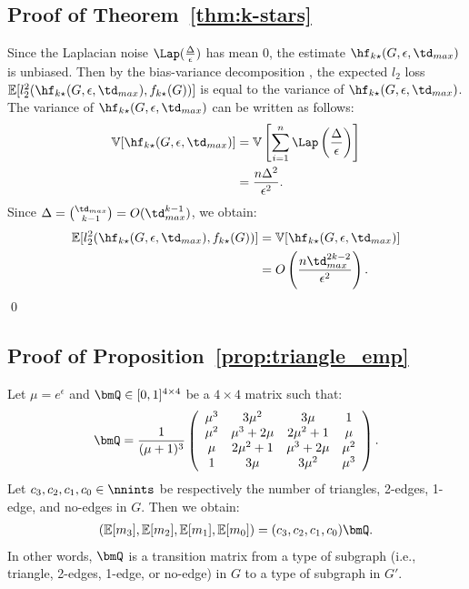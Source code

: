 \subsection{Proof of Theorem~\ref{thm:k-stars}}
Since the Laplacian noise $\Lap(\frac{\Delta}{\epsilon})$ has mean $0$, the estimate $\hf_{k\star}(G, \epsilon, \td_{max})$ is unbiased. 
Then by the bias-variance decomposition \cite{mlpp}, 
the expected $l_2$ loss 
$\mathbb{E}[l_2^2(\hf_{k\star}(G, \epsilon, \td_{max}),\allowbreak f_{k\star}(G))]$ is equal to the variance of $\hf_{k\star}(G, \epsilon, \td_{max})$. 
The variance of $\hf_{k\star}(G, \epsilon, \td_{max})$ can be written as follows:
\begin{align*}
    \mathbb{V}[\hf_{k\star}(G, \epsilon, \td_{max})] 
    &= \mathbb{V}\left[ \sum_{i=1}^n \Lap\left( \frac{\Delta}{\epsilon} \right) \right] \\
    &= \frac{n \Delta^2}{\epsilon^2}.
\end{align*}
Since $\Delta = \binom{\td_{max}}{k-1} = O(\td_{max}^{k-1})$, we obtain:
\begin{align*}
    \mathbb{E}[l_2^2(\hf_{k\star}(G, \epsilon, \td_{max}), f_{k\star}(G))] 
    &= \mathbb{V}[\hf_{k\star}(G, \epsilon, \td_{max})] \\
    &= O\left(\frac{n \td_{max}^{2k-2}}{\epsilon^2}\right).
\end{align*}
\qed

\subsection{Proof of Proposition~\ref{prop:triangle_emp}}
Let $\mu = e^\epsilon$ and $\bmQ \in [0,1]^{4 \times 4}$ be a $4 \times 4$ matrix such that:
\begin{align}
  \bmQ = \frac{1}{(\mu+1)^3} \left(
    \begin{array}{cccc}
      \mu^3 & 3\mu^2 & 3\mu & 1 \\
      \mu^2 & \mu^3+2\mu & 2\mu^2+1 & \mu \\
      \mu & 2\mu^2+1 & \mu^3+2\mu & \mu^2 \\
      1 & 3\mu & 3\mu^2 & \mu^3
    \end{array}
  \right).
  \label{eq:Q_1}
\end{align}
Let $c_3, c_2, c_1, c_0 \in \nnints$ be respectively the number of triangles, 2-edges, 1-edge, and no-edges in $G$. 
Then we obtain:
\begin{align}
(\mathbb{E}[m_3], \mathbb{E}[m_2], \mathbb{E}[m_1],
\mathbb{E}[m_0]) = (c_3, c_2, c_1, c_0) \bmQ.
\label{eq:bmQ}
\end{align}
In other words, $\bmQ$ is a transition matrix from a type of subgraph (i.e., triangle, 2-edges, 1-edge, or no-edge) in $G$ to a type of subgraph in $G'$. 

